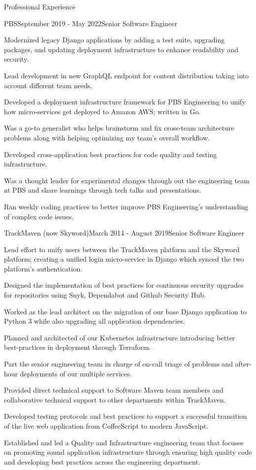 \documentclass{bluefin_cv}
\begin{document}
\begin{bfcvSection}{Professional Experience}
\begin{bfcvWorkSubsection}{PBS}{September 2019 - May 2022}{Senior Software Engineer}
\item Modernized legacy Django applications by adding a test suite, upgrading packages, and updating deployment infrastructure to enhance readability and security.
\item Lead development in new GraphQL endpoint for content distribution taking into account different team needs.
\item Developed a deployment infrastructure framework for PBS Engineering to unify how micro-services get deployed to Amazon AWS; written in Go.
\item Was a go-to generalist who helps brainstorm and fix cross-team architecture problems along with helping optimizing my team's overall workflow.
\item Developed cross-application best practices for code quality and testing infrastructure.
\item Was a thought leader for experimental changes through out the engineering team at PBS and share learnings through tech talks and presentations.
\item Ran weekly coding practices to better improve PBS Engineering's understanding of complex code issues.
\end{bfcvWorkSubsection}

\begin{bfcvWorkSubsection}{TrackMaven (now Skyword)}{March 2014 - August 2019}{Senior Software Engineer}
\item Lead effort to unify users between the TrackMaven platform and the Skyword platform; creating a unified login micro-service in Django which synced the two platform's authentication.
\item Designed the implementation of best practices for continuous security upgrades for repositories using Snyk, Dependabot and Github Security Hub.
\item Worked as the lead architect on the migration of our base Django application to Python 3 while also upgrading all application dependencies.
\item Planned and architected of our Kubernetes infrastructure introducing better best-practices in deployment through Terraform.
\item Part the senior engineering team in charge of on-call triage of problems and after-hour deployments of our multiple services.
\item Provided direct technical support to Software Maven team members and collaborative technical support to other departments within TrackMaven.
\item Developed testing protocols and best practices to support a successful transition of the live web application from CoffeeScript to modern JavaScript.
\item Established and led a Quality and Infrastructure engineering team that focuses on promoting sound application infrastructure through ensuring high quality code and developing best practices across the engineering department.
\end{bfcvWorkSubsection}


\end{bfcvSection}
\end{document}
